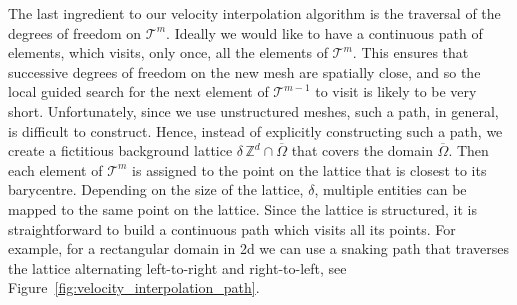 \documentclass[a4paper,12pt,onecolumn]{article}
\begin{document}
The last ingredient to our velocity interpolation algorithm is the
traversal of the degrees of freedom on $\mathcal{T}^m$. Ideally we would like
to have a continuous path of elements, which visits, only once, all the
elements of $\mathcal{T}^m$.
This ensures that successive degrees of freedom on the new
mesh are spatially close, and so the local guided search for the next
element of $\mathcal{T}^{m-1}$ to visit is likely to be very short.
Unfortunately, since we use unstructured meshes, such a path, in general,
is difficult to construct. Hence, instead of explicitly constructing such
a path, we create a fictitious background lattice
$\delta\,{\mathbb Z}^d \cap \overline\Omega$ that covers the domain
$\overline\Omega$.
Then each element of $\mathcal{T}^m$ is assigned to the point
on the lattice that is closest to its barycentre.
Depending on the size of the lattice, $\delta$, multiple
entities can be mapped to the same point on the lattice.
Since the lattice is structured, it
is straightforward to build a continuous path which visits all its points. For
example, for a rectangular domain in 2d we can use a snaking path that
traverses the lattice alternating left-to-right and right-to-left, see
Figure~\ref{fig:velocity_interpolation_path}.
\end{document}
